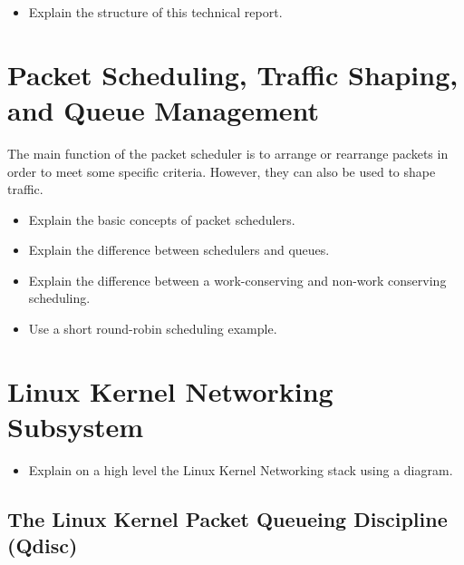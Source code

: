 \documentclass[sigconf, nonacm]{acmart}
\begin{document}
\begin{itemize}
\item Explain the structure of this technical report.
\end{itemize}

\section{Packet Scheduling, Traffic Shaping, and Queue Management}

The main function of the packet scheduler is to arrange or rearrange packets
in order to meet some specific criteria. However, they can also be used to shape
traffic.


\begin{itemize}
  \item Explain the basic concepts of packet schedulers.
  \item Explain the difference between schedulers and queues.
  \item Explain the difference between a work-conserving and non-work conserving scheduling.
  \item Use a short round-robin scheduling example.
\end{itemize}

\section{Linux Kernel Networking Subsystem}

\begin{itemize}
  \item Explain on a high level the Linux Kernel Networking stack using a diagram.
\end{itemize}

\subsection{The Linux Kernel Packet Queueing Discipline (Qdisc)}
\end{document}
